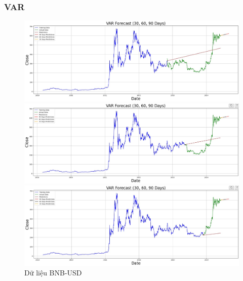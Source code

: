 \documentclass[conference]{IEEEtran}
\begin{document}
\subsubsection{VAR}

\begin{figure}[H]
    \centering
    \begin{minipage}{0.15\textwidth}
    \centering
    \includegraphics[width=1\textwidth]{Figure/VAR_BNB_7.jpg}
    \end{minipage}
    \hfill
    \begin{minipage}{0.15\textwidth}
    \centering
    \includegraphics[width=1\textwidth]{Figure/VAR_BNB_8.jpg}
    \end{minipage}
    \hfill
    \begin{minipage}{0.15\textwidth}
    \centering
    \includegraphics[width=1\textwidth]{Figure/VAR_BNB_9.jpg}
    \end{minipage}
    \caption{Dữ liệu BNB-USD}
    \label{fig:1}
\end{figure}
\end{document}
